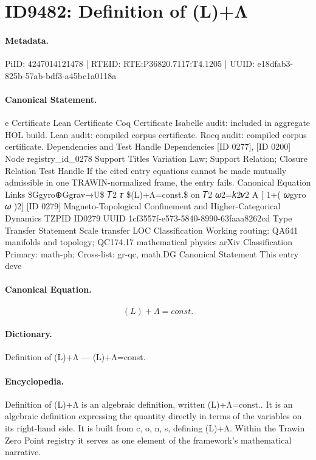 \section*{ID9482: Definition of (L)+Λ}
\paragraph{Metadata.}
PiID: 4247014121478 | RTEID: RTE:P36820.7117:T4.1205 | UUID: e18dfab3-825b-57ab-bdf3-a45bc1a0118a

\paragraph{Canonical Statement.}
e Certificate Lean Certificate Coq Certificate Isabelle audit: included in aggregate HOL build. Lean audit: compiled corpus certificate. Rocq audit: compiled corpus certificate. Dependencies and Test Handle Dependencies [ID 0277], [ID 0200] Node registry\_id\_0278 Support Titles Variation Law; Support Relation; Closure Relation Test Handle If the cited entry equations cannot be made mutually admissible in one TRAWIN-normalized frame, the entry fails. Canonical Equation Links \$Ggyro⊕Ggrav→U\$ 𝑇2 𝜏 \$(L)+Λ=const.\$ on 𝑇2 𝜔2=𝑘2𝑣2 A [ 1+( 𝜔gyro 𝜔 )2] [ID 0279] Magneto-Topological Confinement and Higher-Categorical Dynamics TZPID ID0279 UUID 1cf3557f-e573-5840-8990-63faaa8262cd Type Transfer Statement Scale transfer LOC Classification Working routing: QA641 manifolds and topology; QC174.17 mathematical physics arXiv Classification Primary: math-ph; Cross-list: gr-qc, math.DG Canonical Statement This entry deve

\paragraph{Canonical Equation.}
\[
(L)+Λ=const.
\]

\paragraph{Dictionary.}
Definition of (L)+Λ — (L)+Λ=const.

\paragraph{Encyclopedia.}
Definition of (L)+Λ is an algebraic definition, written (L)+Λ=const.. It is an algebraic definition expressing the quantity directly in terms of the variables on its right-hand side. It is built from c, o, n, s, defining (L)+Λ. Within the Trawin Zero Point registry it serves as one element of the framework's mathematical narrative.
